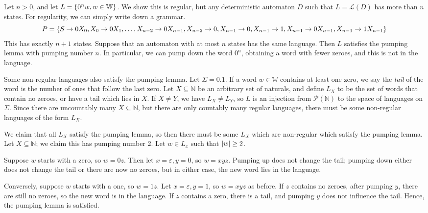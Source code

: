 \begin{example}
	Let \( n > 0 \), and let \( L = \qty{0^n w, w \in \mathbb W} \).
	We show this is regular, but any deterministic automaton \( D \) such that \( L = \mathcal L(D) \) has more than \( n \) states.
	For regularity, we can simply write down a grammar.
	\[ P = \qty{S \to 0X_0, X_0 \to 0X_1, \dots, X_{n-2} \to 0X_{n-1}, X_{n-2} \to 0, X_{n-1} \to 0, X_{n-1} \to 1, X_{n-1} \to 0X_{n-1}, X_{n-1} \to 1X_{n-1}} \]
	This has exactly \( n + 1 \) states.
	Suppose that an automaton with at most \( n \) states has the same language.
	Then \( L \) satisfies the pumping lemma with pumping number \( n \).
	In particular, we can pump down the word \( 0^n \), obtaining a word with fewer zeroes, and this is not in the language.
\end{example}
\begin{example}
	Some non-regular languages also satisfy the pumping lemma.
	Let \( \Sigma = \qty{0,1} \).
	If a word \( w \in \mathbb W \) contains at least one zero, we say the \emph{tail} of the word is the number of ones that follow the last zero.
	Let \( X \subseteq \mathbb N \) be an arbitrary set of naturals, and define \( L_X \) to be the set of words that contain no zeroes, or have a tail which lies in \( X \).
	If \( X \neq Y \), we have \( L_X \neq L_Y \), so \( L \) is an injection from \( \mathcal P(\mathbb N) \) to the space of languages on \( \Sigma \).
	Since there are uncountably many \( X \subseteq \mathbb N \), but there are only countably many regular languages, there must be some non-regular languages of the form \( L_X \).

	We claim that all \( L_X \) satisfy the pumping lemma, so then there must be some \( L_X \) which are non-regular which satisfy the pumping lemma.
	Let \( X \subseteq \mathbb N \); we claim this has pumping number 2.
	Let \( w \in L_x \) such that \( \abs{w} \geq 2 \).

	Suppose \( w \) starts with a zero, so \( w = 0z \).
	Then let \( x = \varepsilon, y = 0 \), so \( w = xyz \).
	Pumping up does not change the tail; pumping down either does not change the tail or there are now no zeroes, but in either case, the new word lies in the language.
	
	Conversely, suppose \( w \) starts with a one, so \( w = 1z \).
	Let \( x = \varepsilon, y = 1 \), so \( w = xyz \) as before.
	If \( z \) contains no zeroes, after pumping \( y \), there are still no zeroes, so the new word is in the language.
	If \( z \) contains a zero, there is a tail, and pumping \( y \) does not influence the tail.
	Hence, the pumping lemma is satisfied.
\end{example}

